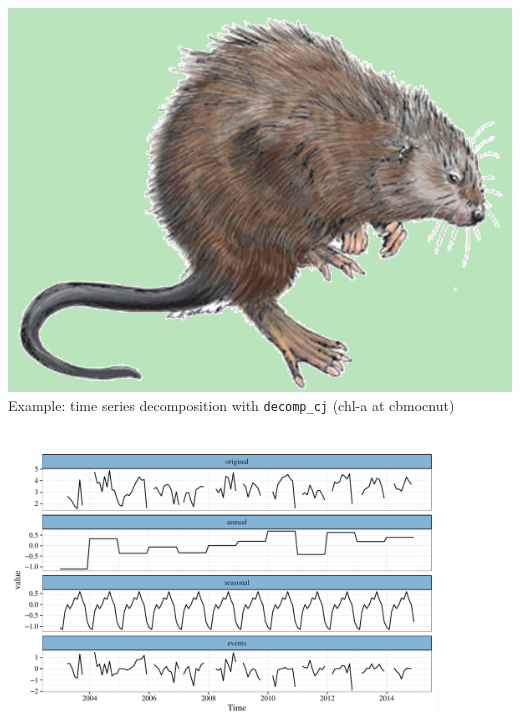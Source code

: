 \documentclass[serif]{beamer}\usepackage[]{graphicx}\usepackage[]{color}
\newenvironment{knitrout}{}{} %
\begin{document}
\begin{frame}[fragile]{\includegraphics[width=0.05\paperwidth]{fig/muskrat.png}\hspace{0.07in}{\bf SWMPrats.net: The SWMPr package}}
Example: time series decomposition with \texttt{decomp\_cj} (chl-a at cbmocnut)\\~\\
\begin{knitrout}
\color{fgcolor}

{\centering \includegraphics[width=0.85\textwidth]{fig/decomp_dep-1} 

}



\end{knitrout}
\end{frame}
\end{document}
